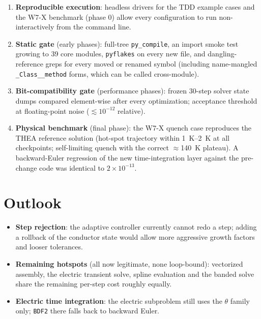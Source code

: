 \documentclass[11pt,a4paper]{article}
\newcommand{\code}[1]{\texttt{#1}}
\begin{document}
\begin{enumerate}
  \item \textbf{Reproducible execution}: headless drivers for the TDD example cases
        and the W7-X benchmark (phase 0) allow every configuration to run
        non-interactively from the command line.
  \item \textbf{Static gate} (early phases): full-tree \code{py\_compile}, an import
        smoke test growing to 39 core modules, \code{pyflakes} on every new file, and
        dangling-reference greps for every moved or renamed symbol (including
        name-mangled \code{\_Class\_\_method} forms, which can be called cross-module).
  \item \textbf{Bit-compatibility gate} (performance phases): frozen 30-step solver
        state dumps compared element-wise after every optimization; acceptance
        threshold at floating-point noise ($\lesssim 10^{-12}$ relative).
  \item \textbf{Physical benchmark} (final phase): the W7-X quench case reproduces
        the THEA reference solution (hot-spot trajectory within
        \SIrange{1}{2}{K} at all checkpoints; self-limiting quench with the correct
        $\approx$\SI{140}{K} plateau). A backward-Euler regression of the new
        time-integration layer against the pre-change code was identical to
        $2\times10^{-13}$.
\end{enumerate}

\section{Outlook}

\begin{itemize}
  \item \textbf{Step rejection}: the adaptive controller currently cannot redo a step;
        adding a rollback of the conductor state would allow more aggressive growth
        factors and looser tolerances.
  \item \textbf{Remaining hotspots} (all now legitimate, none loop-bound):
        vectorized assembly, the electric transient solve, spline evaluation and the
        banded solve share the remaining per-step cost roughly equally.
  \item \textbf{Electric time integration}: the electric subproblem still uses the
        $\theta$ family only; \code{BDF2} there falls back to backward Euler.
\end{itemize}
\end{document}
